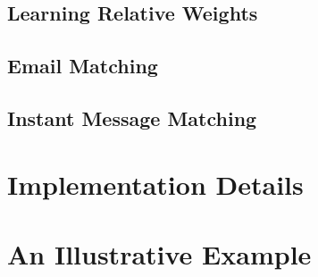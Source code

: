	\subsection{Learning Relative Weights}	
	\subsection{Email Matching}
	\subsection{Instant Message Matching}
\section{Implementation Details}
\section{An Illustrative Example}	

